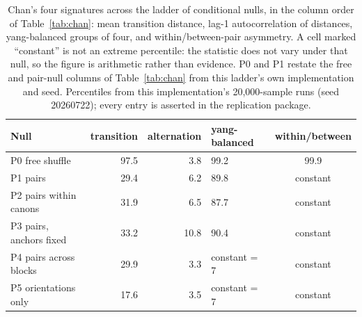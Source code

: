 \documentclass[11pt]{article}
\begin{document}
\begin{table}[t]
\centering
\caption{Chan's four signatures across the ladder of conditional nulls, in the column order of Table~\ref{tab:chan}: mean transition distance, lag-1 autocorrelation of distances, yang-balanced groups of four, and within/between-pair asymmetry. A cell marked ``constant'' is not an extreme percentile: the statistic does not vary under that null, so the figure is arithmetic rather than evidence. P0 and P1 restate the free and pair-null columns of Table~\ref{tab:chan} from this ladder's own implementation and seed. Percentiles from this implementation's 20,000-sample runs (seed 20260722); every entry is asserted in the replication package.}
\label{tab:escalera}
\small
\begin{tabular}{@{}lrrlc@{}}
\toprule
Null & transition & alternation & yang-balanced & within/between \\
\midrule
P0 free shuffle              & 97.5 & 3.8  & 99.2         & 99.9 \\
P1 pairs                     & 29.4 & 6.2  & 89.8         & constant \\
P2 pairs within canons       & 31.9 & 6.5  & 87.7         & constant \\
P3 pairs, anchors fixed      & 33.2 & 10.8 & 90.4         & constant \\
P4 pairs across blocks       & 29.9 & 3.3  & constant = 7 & constant \\
P5 orientations only         & 17.6 & 3.5  & constant = 7 & constant \\
\bottomrule
\end{tabular}
\end{table}
\end{document}
